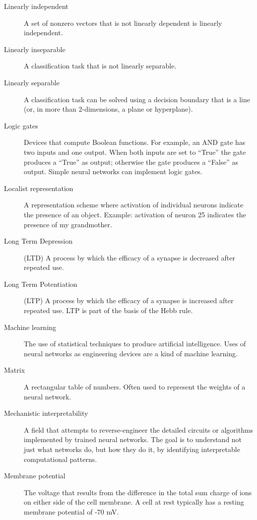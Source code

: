 \begin{description}
\item[Linearly independent] A set of nonzero vectors that is not linearly
dependent is linearly independent.

\item[Linearly inseparable] A classification task that is not linearly separable.

\item[Linearly separable] A classification task can be solved using a decision boundary that is a line (or, in more than 2-dimensions, a plane or hyperplane).

\item[Logic gates] Devices that compute Boolean functions. For example, an AND gate has two inputs and one output. When both inputs are set to ``True'' the gate produces a ``True'' as output; otherwise the gate produces a ``False'' as output. Simple neural networks can implement logic gates.

\item[Localist representation] A representation scheme where activation of individual neurons indicate the presence of an object. Example: activation of neuron 25 indicates the presence of my grandmother.

\item[Long Term Depression] (LTD) A  process by which the efficacy of a synapse is decreased after repeated use.

\item[Long Term Potentiation] (LTP) A process by which the efficacy of a synapse is increased after repeated use. LTP is part of the basis of the Hebb rule.

\item[Machine learning] The use of statistical techniques to produce artificial intelligence. Uses of neural networks as engineering devices are a kind of machine learning.

\item[Matrix] A rectangular table of numbers. Often used to represent the weights of a neural network.

\item[Mechanistic interpretability] A field that attempts to reverse-engineer the detailed circuits or algorithms implemented by trained neural networks. The goal is to understand not just what networks do, but how they do it, by identifying interpretable computational patterns.

\item[Membrane potential] The voltage that results from the difference in the total sum charge of ions on either side of the cell membrane. A cell at rest typically has a resting membrane potential of -70 mV. 


\end{description}
